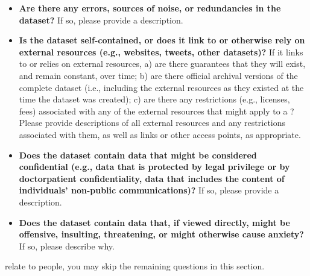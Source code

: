 \begin{itemize}
\item \textbf{Are there any errors, sources of noise, or redundancies
    in the dataset?} If so, please provide a description.

\item \textbf{Is the dataset self-contained, or does it link to or
    otherwise rely on external resources (e.g., websites, tweets,
    other datasets)?} If it links to or relies on external resources,
    a) are there guarantees that they will exist, and remain constant,
    over time; b) are there official archival versions of the complete
    dataset (i.e., including the external resources as they existed at
    the time the dataset was created); c) are there any restrictions
    (e.g., licenses, fees) associated with any of the external
    resources that might apply to a ? Please provide
    descriptions of all external resources and any restrictions
    associated with them, as well as links or other access points, as
    appropriate.

\item \textbf{Does the dataset contain data that might be considered
    confidential (e.g., data that is protected by legal privilege or
    by doctor\edit{--}patient confidentiality, data that includes the content
    of individuals' non-public communications)?} If so, please provide
    a description.

\item \textbf{Does the dataset contain data that, if viewed directly,
    might be offensive, insulting, threatening, or might otherwise
    cause anxiety?} If so, please describe why.

\end{itemize}

relate to people, you may skip the remaining questions in this section.

